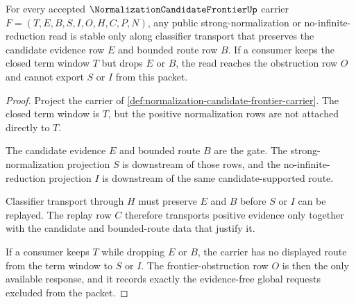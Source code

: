 \begin{theorem}
\label{thm:normalization-candidate-frontier-stability}
For every accepted $\NormalizationCandidateFrontierUp$ carrier $F=(T,E,B,S,I,O,H,C,P,N)$, any public strong-normalization or no-infinite-reduction read is stable only along classifier transport that preserves the candidate evidence row $E$ and bounded route row $B$. If a consumer keeps the closed term window $T$ but drops $E$ or $B$, the read reaches the obstruction row $O$ and cannot export $S$ or $I$ from this packet.
\end{theorem}
\begin{proof}
Project the carrier of \autoref{def:normalization-candidate-frontier-carrier}. The closed term window is $T$, but the positive normalization rows are not attached directly to $T$.

The candidate evidence $E$ and bounded route $B$ are the gate. The strong-normalization projection $S$ is downstream of those rows, and the no-infinite-reduction projection $I$ is downstream of the same candidate-supported route.

Classifier transport through $H$ must preserve $E$ and $B$ before $S$ or $I$ can be replayed. The replay row $C$ therefore transports positive evidence only together with the candidate and bounded-route data that justify it.

If a consumer keeps $T$ while dropping $E$ or $B$, the carrier has no displayed route from the term window to $S$ or $I$. The frontier-obstruction row $O$ is then the only available response, and it records exactly the evidence-free global requests excluded from the packet.
\end{proof}

